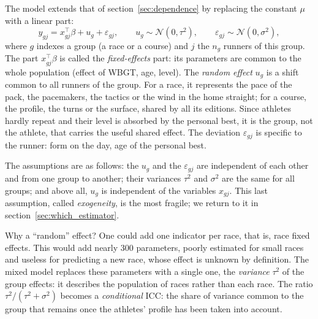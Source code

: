 \documentclass[11pt,a4paper]{article}
\begin{document}
The model extends that of section~\ref{sec:dependence} by replacing the constant $\mu$ with a linear part:
\begin{equation}\label{eq:mixed}
y_{gj} = x_{gj}^\top\beta + u_g + \varepsilon_{gj},\qquad u_g \sim \mathcal N(0, \tau^2),\qquad
\varepsilon_{gj}\sim\mathcal N(0,\sigma^2),
\end{equation}
where $g$ indexes a group (a race or a course) and $j$ the $n_g$ runners of this group. The part $x_{gj}^\top\beta$ is
called the \emph{fixed-effects} part: its parameters are common to the whole population (effect of WBGT, age, level).
The \emph{random effect} $u_g$ is a shift common to all runners of the group. For a race, it represents the pace of the
pack, the pacemakers, the tactics or the wind in the home straight; for a course, the profile, the turns or the
surface, shared by all its editions. Since athletes hardly repeat and their level is absorbed by the personal best, it
is the group, not the athlete, that carries the useful shared effect. The deviation $\varepsilon_{gj}$ is specific to
the runner: form on the day, age of the personal best.

The assumptions are as follows: the $u_g$ and the $\varepsilon_{gj}$ are independent of each other and from one group
to another; their variances $\tau^2$ and $\sigma^2$ are the same for all groups; and above all, $u_g$ is independent of
the variables $x_{gj}$. This last assumption, called \emph{exogeneity}, is the most fragile; we return to it in
section~\ref{sec:which_estimator}.

Why a ``random'' effect? One could add one indicator per race, that is, race fixed effects. This would add nearly 300
parameters, poorly estimated for small races and useless for predicting a new race, whose effect is unknown by
definition. The mixed model replaces these parameters with a single one, the \emph{variance} $\tau^2$ of the group
effects: it describes the population of races rather than each race. The ratio $\tau^2/(\tau^2+\sigma^2)$ becomes a
\emph{conditional} ICC: the share of variance common to the group that remains once the athletes' profile has been
taken into account.
\end{document}
